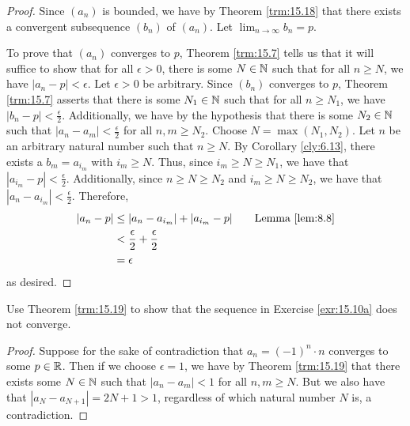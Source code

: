 \documentclass[../main.tex]{subfiles}
\begin{document}
\begin{theorem}
\begin{proof}
        Since $(a_n)$ is bounded, we have by Theorem \ref{trm:15.18} that there exists a convergent subsequence $(b_n)$ of $(a_n)$. Let $\lim_{n\to\infty}b_n=p$.\par
        To prove that $(a_n)$ converges to $p$, Theorem \ref{trm:15.7} tells us that it will suffice to show that for all $\epsilon>0$, there is some $N\in\mathbb{N}$ such that for all $n\geq N$, we have $|a_n-p|<\epsilon$. Let $\epsilon>0$ be arbitrary. Since $(b_n)$ converges to $p$, Theorem \ref{trm:15.7} asserts that there is some $N_1\in\mathbb{N}$ such that for all $n\geq N_1$, we have $|b_n-p|<\frac{\epsilon}{2}$. Additionally, we have by the hypothesis that there is some $N_2\in\mathbb{N}$ such that $|a_n-a_m|<\frac{\epsilon}{2}$ for all $n,m\geq N_2$. Choose $N=\max(N_1,N_2)$. Let $n$ be an arbitrary natural number such that $n\geq N$. By Corollary \ref{cly:6.13}, there exists a $b_m=a_{i_m}$ with $i_m\geq N$. Thus, since $i_m\geq N\geq N_1$, we have that $|a_{i_m}-p|<\frac{\epsilon}{2}$. Additionally, since $n\geq N\geq N_2$ and $i_m\geq N\geq N_2$, we have that $|a_n-a_{i_m}|<\frac{\epsilon}{2}$. Therefore,
        \begin{align*}
            |a_n-p| &\leq |a_n-a_{i_m}|+|a_{i_m}-p|\tag*{Lemma \ref{lem:8.8}}\\
            &< \frac{\epsilon}{2}+\frac{\epsilon}{2}\\
            &= \epsilon
        \end{align*}
        as desired.
    \end{proof}
\end{theorem}

\begin{theorem}\label{trm:15.20}
    Use Theorem \ref{trm:15.19} to show that the sequence in Exercise \ref{exr:15.10a} does not converge.
    \begin{proof}
        Suppose for the sake of contradiction that $a_n=(-1)^n\cdot n$ converges to some $p\in\mathbb{R}$. Then if we choose $\epsilon=1$, we have by Theorem \ref{trm:15.19} that there exists some $N\in\mathbb{N}$ such that $|a_n-a_m|<1$ for all $n,m\geq N$. But we also have that $|a_N-a_{N+1}|=2N+1>1$, regardless of which natural number $N$ is, a contradiction.
    \end{proof}
\end{theorem}
\end{document}
